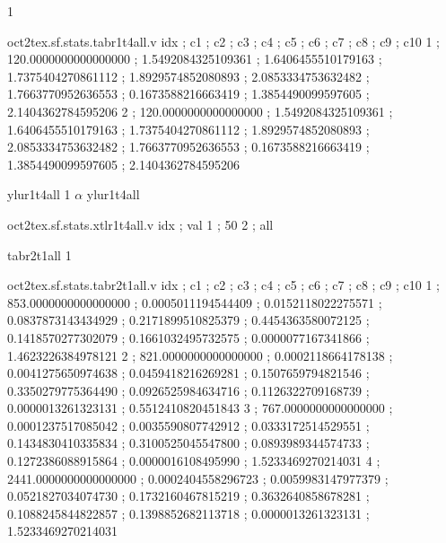 \expandafter\def\csname oct2tex.sf.stats.tabr1t4all.u\endcsname{1}
\begin{filecontents}[overwrite]{oct2tex.sf.stats.tabr1t4all.v}
idx ; c1 ; c2 ; c3 ; c4 ; c5 ; c6 ; c7 ; c8 ; c9 ; c10
1 ; 120.0000000000000000 ; 1.5492084325109361 ; 1.6406455510179163 ; 1.7375404270861112 ; 1.8929574852080893 ; 2.0853334753632482 ; 1.7663770952636553 ; 0.1673588216663419 ; 1.3854490099597605 ; 2.1404362784595206
2 ; 120.0000000000000000 ; 1.5492084325109361 ; 1.6406455510179163 ; 1.7375404270861112 ; 1.8929574852080893 ; 2.0853334753632482 ; 1.7663770952636553 ; 0.1673588216663419 ; 1.3854490099597605 ; 2.1404362784595206
\end{filecontents}
\expandafter\def\csname oct2tex.sf.stats.ylur1t4all.t\endcsname{ylur1t4all}
\expandafter\def\csname oct2tex.sf.stats.ylur1t4all.u\endcsname{1}
\expandafter\def\csname oct2tex.sf.stats.ylur1t4all.v\endcsname{$\alpha$}
\expandafter\def\csname oct2tex.sf.stats.xtlr1t4all.t\endcsname{ylur1t4all}
\begin{filecontents}[overwrite]{oct2tex.sf.stats.xtlr1t4all.v}
idx ; val
1 ; 50
2 ; all
\end{filecontents}
\expandafter\def\csname oct2tex.sf.stats.tabr2t1all.t\endcsname{tabr2t1all}
\expandafter\def\csname oct2tex.sf.stats.tabr2t1all.u\endcsname{1}
\begin{filecontents}[overwrite]{oct2tex.sf.stats.tabr2t1all.v}
idx ; c1 ; c2 ; c3 ; c4 ; c5 ; c6 ; c7 ; c8 ; c9 ; c10
1 ; 853.0000000000000000 ; 0.0005011194544409 ; 0.0152118022275571 ; 0.0837873143434929 ; 0.2171899510825379 ; 0.4454363580072125 ; 0.1418570277302079 ; 0.1661032495732575 ; 0.0000077167341866 ; 1.4623226384978121
2 ; 821.0000000000000000 ; 0.0002118664178138 ; 0.0041275650974638 ; 0.0459418216269281 ; 0.1507659794821546 ; 0.3350279775364490 ; 0.0926525984634716 ; 0.1126322709168739 ; 0.0000013261323131 ; 0.5512410820451843
3 ; 767.0000000000000000 ; 0.0001237517085042 ; 0.0035590807742912 ; 0.0333172514529551 ; 0.1434830410335834 ; 0.3100525045547800 ; 0.0893989344574733 ; 0.1272386088915864 ; 0.0000016108495990 ; 1.5233469270214031
4 ; 2441.0000000000000000 ; 0.0002404558296723 ; 0.0059983147977379 ; 0.0521827034074730 ; 0.1732160467815219 ; 0.3632640858678281 ; 0.1088245844822857 ; 0.1398852682113718 ; 0.0000013261323131 ; 1.5233469270214031
\end{filecontents}
